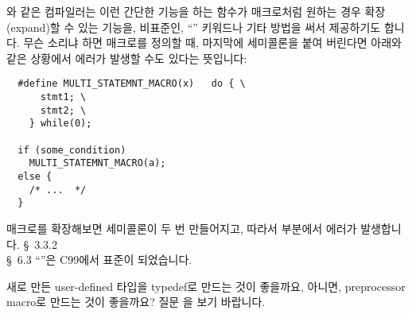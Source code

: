 \begin{faq}
        와 같은 컴파일러는 이런 간단한 기능을 하는 함수가 매크로처럼
        원하는 경우 확장(expand)할 수 있는 기능을, 비표준인, ``''
        키워드나 기타 방법을 써서 제공하기도 합니다.
\T
	무슨 소리냐 하면
	매크로를 정의할 때, 마지막에 세미콜론을 붙여 버린다면
	아래와 같은 상황에서 에러가 발생할 수도 있다는 뜻입니다:
\begin{verbatim}
  #define MULTI_STATEMNT_MACRO(x)	do { \
      stmt1; \
      stmt2; \
    } while(0);

  if (some_condition)
    MULTI_STATEMNT_MACRO(a);
  else {
    /* ...  */
  }
\end{verbatim}

	매크로를 확장해보면 세미콜론이 두 번 만들어지고, 따라서
	 부분에서 에러가 발생합니다.
\R
	\cite{hs} \S\ 3.3.2  \\
	\cite{ctp} \S\ 6.3 
\T
	``\TT{inline}''은 C99에서 표준이 되었습니다.

\R
\end{faq}

\begin{faq}
	새로 만든 user-defined 타입을 typedef로 만드는 것이 좋을까요, 아니면,
        preprocessor macro로 만드는 것이 좋을까요?
\A
	질문 \ql{1.13}을 보기 바랍니다.
\end{faq}

